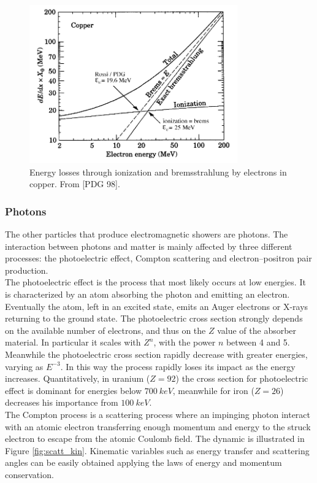 \begin{figure}
	\centering
	\includegraphics[width=0.8\textwidth]{IMG/Cap2/Cu_rad_ion}
	\caption{Energy losses through ionization and bremsstrahlung by  electrons in copper. From [PDG 98].}
	\label{fig:Cu_rad_ion}
\end{figure}

\subsubsection*{Photons}
The other particles that produce electromagnetic showers are photons. The interaction between photons and matter is mainly affected by three different processes: the photoelectric effect, Compton scattering and electron–positron pair production.\\

The photoelectric effect is the process that most likely occurs at low energies. It is characterized by an atom absorbing the photon and emitting an electron. Eventually the atom, left in an excited state, emits an Auger electrons or X-rays returning to the ground state. The photoelectric cross section strongly depends on the available number of  electrons,  and  thus  on  the $Z$ value  of  the  absorber  material. In particular it scales with $Z^n$, with the power $n$ between 4 and 5. Meanwhile the photoelectric cross section rapidly decrease with greater energies, varying as $E^{-3}$. In this way the process rapidly loses its impact as the energy increases. Quantitatively, in uranium ($Z=92$) the cross section for photoelectric effect is dominant for energies below $700\ keV$, meanwhile for iron  ($Z=26$) decreases his importance from $100\ keV$.\\

The Compton process is a scattering process where an impinging  photon interact with an atomic electron transferring enough momentum and energy to the struck electron to escape from the atomic Coulomb field. The dynamic is illustrated in Figure \ref{fig:scatt_kin}. Kinematic variables such as energy transfer and scattering angles can be easily obtained applying the laws of energy and momentum conservation. 

